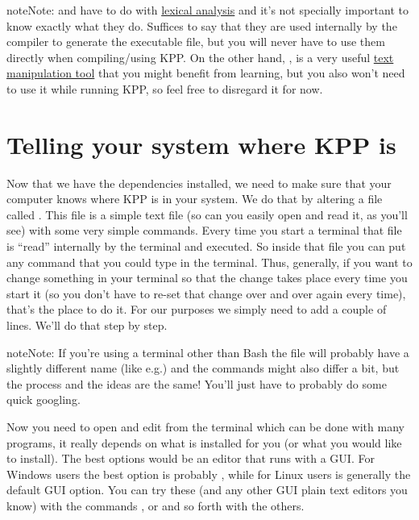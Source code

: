 \documentclass[letterpaper,10pt,openany,oneside]{sphinxmanual}
\begin{document}
\begin{notice}{note}{Note:}
 and  have to do with \href{https://en.wikipedia.org/wiki/Lexical\_analysis}{lexical analysis} and it's not specially
important to know exactly what they do. Suffices to say that they are used
internally by the compiler to generate the executable file, but you will never
have to use them directly when compiling/using KPP.  On the other hand,
, is a very useful \href{https://en.wikipedia.org/wiki/Sed}{text manipulation tool} that you might benefit from learning, but
you also won't need to use it while running KPP, so feel free to disregard it for now.
\end{notice}


\section{Telling your system where KPP is}
\label{compiling:telling-your-system-where-kpp-is}
Now that we have the dependencies installed, we need to make sure that your
computer knows where KPP is in your system. We do that by altering a file
called . This file is a simple text file (so can you easily open and
read it, as you'll see) with some very simple commands. Every time you start a
terminal that file is ``read'' internally by the terminal and executed. So inside
that file you can put any command that you could type in the terminal. Thus,
generally, if you want to change something in your terminal so that the change
takes place every time you start it (so you don't have to re-set that change
over and over again every time), that's the place to do it. For our purposes we
simply need to add a couple of lines. We'll do that step by step.

\begin{notice}{note}{Note:}
If you're using a terminal other than Bash the  file will probably
have a slightly different name (like  e.g.) and the commands might
also differ a bit, but the process and the ideas are the same! You'll just have
to probably do some quick googling.
\end{notice}

Now you need to open and edit  from the terminal which can be done
with many programs, it really depends on what is installed for you (or what you
would like to install). The best options would be an editor that runs with a
GUI. For Windows users the best option is probably , while for
Linux users  is generally the default GUI option. You can try these
(and any other GUI plain text editors you know) with the commands , or  and so forth with the others.
\end{document}
